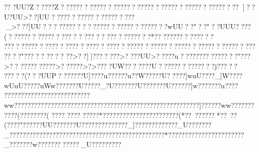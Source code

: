 {{{{{{{{{{{{{{{{{{{{{{{{{{{{{{{{{{{{{{{{{{{{{{{{{{{{{{{{{{{{{{{{{{{{{{{{{{{{{{{{{{{{{{{{{{{{{{{{{{{{{{{{{{{{{{{{{{{{{{{{{{{{{{{{{{{{{{{{{{{{{{{{{{{{{{{{{{{{{{{{{{{{{{{{{{{{{{{{{{{{{{{{{{{{{{{{{{{{{{{{{{{{{{{{{{{{{{{{{{{{{{{{{{{{{{{{{{{{{{{{{{{{{{{{{{{{{{{{{{{{{{{{{{{{{{{{{{{{{{{{{{{{{{{{{{{{{{{{{{{{{{{{{{{{{{{{{{{{{{{{{{{{{{{{{{{{{{{{{{{{{{{{{{{{{{{{{{{{{{{{{{{{{{{{{{{{{{{{{{{{{{{{{{{{{{{{{{{{{{{{{{{{{{{{{{{{{{{{{{{{{{{{{{{{{{{{{{{{{{{{{{{{{{{{{{{{{{{{{{{{{{{{{{{{{{{{{{{{{{{{{{{{{{{{{{{{{{{{{{{{{{{{{{{{{{{{{{{{{{{{{{{{{{{{{{{{{{{{{{{{{{{{{{{{{{{{{{{{{{{{{{{{{{{{{{{{{{{{{{{{{{{{{{{{{{{{{{{{{{{{{{{{{{{{{{{{{{{{{{{{{{{{{{{{{{{{{{{{{{{{{{{{{{{{{{{{{{{{{{{{{{{{{{{{{{{{{{{{{{{{{{{{{{{{{{{{{{{{{{{{{{{{{{{{{{{{{{{{{{{{{{{{{{{{{{{{{{{{{{{{{{{{{{{{{{{{{{{{{{{{{{{{{{{{{{{{{{{{{{{{{{{{{{{{{{{{{{{{{{{{{{{{{{{{{{{{{{{{{{{{{{{{{{{{{{{{{{{{{{{{{{{{{{{{{{{{{{{{{{{{{{{{{{{{{{{{{{{{{{{{{{{{{{{{{{{{{{{{{{{{{{{{{{{{{{{{{{{{{{{{{{{{{{{{{{{{{{{{{{{{{{{{{{{{{{{{{{{{{{{{{{{{{{{{{{{{{{{{{{{{{{{{{{{{{{{{{{{{{{{{{{{{{{{{{{{{{{{{{{{{{{{{{{{{{{{{{{{{{{{{{{{{{{{{{{{{{{{{{{{{{{{{{{{{{{{{{{{{{{{{{{{{{{{{{{{{{{{{{{{{{{{{{{{{{{{{{{{{{{{{{{{{{{{{{{{{{{{{{{{{{{{{{{{{{{{{{{{{{{{{{{{{{{{{{{{{{{{{{{{{{{{{{{{{{{{{{{{{{{{{{{{{{{{{{{{{{{{{{{{{{{{{{{{{{{{{{{{{{{{{{{{{{{{{{{{{{{{{{{{{{{{{{{{{{{{{{{{{{{{{{{{{{{{{{{{{{{{{{{{{{{{{{{{{{{{{{{{{{{{{{{{{{{{{{{{{{{{{{{{{{{{{{{{{{{{{{{{{{{{{{{{{{{{{{{{{{{{{{{{{{{{{{{{{{{{{{{{{{{{{{{{{{{{{{{{{{{{{{{{{{{{{{{{{{{{{{{{{{{{{{{{{{{{{{{{{{{{{{{{{{{{{{{{{{{{{{{{{{{{{{{{{{{{{{{{{{{{{{{{{{{{{{{{{{{{{{{{{{{{{{{{{{{{{{{{{{{{{{{{{{{{{{{{{{{{{{{{{{{{{{{{{{{{{{{{{{{{{{{{{{{{{{{{{{{{{{{{{{{{{{{{{{{{{{{{{{{{{{{{{{{{{{{{{{{{{{{{{{{{{{{{{{{{{{{{{{{{{{{{{{{{{{{{{{{{{{{{{{{{{{{{{{{{{{{{{{{{{{{{{{{{{{{{{{{{{{{{{{{{{{{{{{{{{{{{{{{{{{{{{{{{{{{{{{{{{{{{{{{{{{{{{{{{{{???UU?Z?????Z?????????????????????????????????????????????]??U?UU>??}]UU?? ???????????????????_>???]UU??    ????????    ????????????????????}wUU??"   ??"   ??UUU????   (??????????????  ???? ???????????????? *????? ????? ????? ??????????? ????? ????? ????? ?????????????????????????????????????????"????? 
???? 
??>??]]???????>????UU>?????u???????????????"???>??
??????????>??????>?>?    ???UW???????U??????????????j?????
?????  (???UUP ??    ?????U]????u??????u??W?????U?????]wuU????}_]W????wUuU?????uWw???????U?????_?U???????U???????U??????]w???????u????   ?????  ?????????????????????w}w????????????????????????????????????????????????????????]??????ww???????
????(????????(  ????    ????   ?????  *?????  ??????  ??????  ??????  (*??~?   ?????  *??~?  ?(????   "??????UU???????U??????????????_]?????????????_U???????_???????????????????????????????????????????????*???????????????????????_???????w????????????_U????   ?????   }}}}}}}}}}}}}}}}}}}}}}}}}}}}}}}}}}}}}}}}}}}}}}}}}}}}}}}}}}}}}}}}}}}}}}}}}}}}}}}}}}}}}}}}}}}}}}}}}}}}}}}}}}}}}}}}}}}}}}}}}}}}}}}}}}}}}}}}}}}}}}}}}}}}}}}}}}}}}}}}}}}}}}}}}}}}}}}}}}}}}}}}}}}}}}}}}}}}}}}}}}}}}}}}}}}}}}}}}}}}}}}}}}}}}}}}}}}}}}}}}}}}}}}}}}}}}}}}}}}}}}}}}}}}}}}}}}}}}}}}}}}}}}}}}}}}}}}}}}}}}}}}}}}}}}}}}}}}}}}}}}}}}}}}}}}}}}}}}}}}}}}}}}}}}}}}}}}}}}}}}}}}}}}}}}}}}}}}}}}}}}}}}}}}}}}}}}}}}}}}}}}}}}}}}}}}}}}}}}}}}}}}}}}}}}}}}}}}}}}}}}}}}}}}}}}}}}}}}}}}}}}}}}}}}}}}}}}}}}}}}}}}}}}}}}}}}}}}}}}}}}}}}}}}}}}}}}}}}}}}}}}}}}}}}}}}}}}}}}}}}}}}}}}}}}}}}}}}}}}}}}}}}}}}}}}}}}}}}}}}}}}}}}}}}}}}}}}}}}}}}}}}}}}}}}}}}}}}}}}}}}}}}}}}}}}}}}}}}}}}}}}}}}}}}}}}}}}}}}}}}}}}}}}}}}}}}}}}}}}}}}}}}}}}}}}}}}}}}}}}}}}}}}}}}}}}}}}}}}}}}}}}}}}}}}}}}}}}}}}}}}}}}}}}}}}}}}}}}}}}}}}}}}}}}}}}}}}}}}}}}}}}}}}}}}}}}}}}}}}}}}}}}}}}}}}}}}}}}}}}}}}}}}}}}}}}}}}}}}}}}}}}}}}}}}}}}}}}}}}}}}}}}}}}}}}}}}}}}}}}}}}}}}}}}}}}}}}}}}}}}}}}}}}}}}}}}}}}}}}}}}}}}}}}}}}}}}}}}}}}}}}}}}}}}}}}}}}}}}}}}}}}}}}}}}}}}}}}}}}}}}}}}}}}}}}}}}}}}}}}}}}}}}}}}}}}}}}}}}}}}}}}}}}}}}}}}}}}}}}}}}}}}}}}}}}}}}}}}}}}}}}}}}}}}}}}}}}}}}}}}}}}}}}}}}}}}}}}}}}}}}}}}}}}}}}}}}}}}}}}}}}}}}}}}}}}}}}}}}}}}}}}}}}}}}}}}}}}}}}}}}}}}}}}}}}}}}}}}}}}}}}}}}}}}}}}}}}}}}}}}}}}}}}}}}}}}}}}}}}}}}}}}}}}}}}}}}}}}}}}}}}}}}}}}}}}}}}}}}}}}}}}}}}}}}}}}}}}}}}}}}}}}}}}}}}}}}}}}}}}}}}}}}}}}}}}}}}}}}}}}}}}}}}}}}}}}}}}}}}}}}}}}}}}}}}}}}}}}}}}}}}}}}}}}}}}}}}}}}}}}}}}}}}}}}}}}}}}}}}}}}}}}}}}}}}}}}}}}}}}}}}}}}}}}}}}}}}}}}}}}}}}}}}}}}}}}}}}}}}}}}}}}}}}}}}}}}}}}}}}}}}}}}}}}}}}}}}}}}}}}}}}}}}}}}}}}}}}}}}}}}}}}}}}}}}}}}}}}}}}}}}}}}}}}}}}}}}}}}}}}}}}}}}}}}}}}}}}}}}}}}}}}}}}}}}}}}}}}}}}}}}}}}}}}}}}}}}}}}}}}}}}}}}}}}}}}}}}}}}}}}}}}}}}}}}}}}}}}}}}}}}}}}}}}}}}}}}}}}}}}}}}}}}}}}}}}}}}}}}}}}}}}}}}}}}}}}}}}}}}}}}}}}}}}}}}}}}}}}}}}}}}}}}}}}}}}}}}}}}}}}}}}
